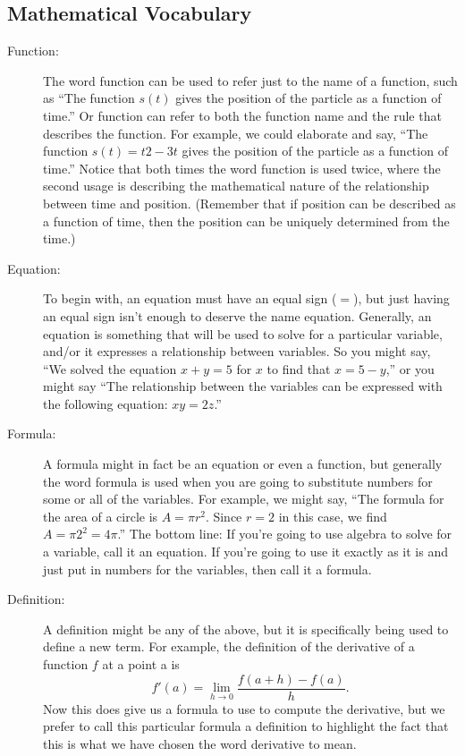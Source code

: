 \subsection{Mathematical Vocabulary}
\begin{description}
    \item[Function:] The word function can be used to refer just to the name of a
        function, such as  ``The function $s(t)$ gives the position of the particle as a
        function of time.'' Or function can refer to both the function name and the rule
        that describes the function. For example, we could elaborate and say, ``The
        function $s(t) = t2 - 3t$ gives the position of the particle as a function of
        time.'' Notice that both times the word function is used twice, where the second
        usage is describing the mathematical nature of the relationship between time and
        position. (Remember that if position can be described as a function of time, then
        the position can be uniquely determined from the time.)
    \item[Equation:] To begin with, an equation must have an equal sign ($=$), but just
        having an equal sign isn't enough to deserve the name equation. Generally, an
        equation is something that will be used to solve for a particular variable, and/or
        it expresses a relationship between variables. So you might say, ``We solved the
        equation $x + y = 5$ for $x$ to find that $x = 5 - y$,'' or you might say ``The
        relationship between the variables can be expressed with the following equation:
        $xy = 2z$.''

    \item[Formula:] A formula might in fact be an equation or even a function, but
        generally the word formula is used when you are going to substitute numbers for
        some or all of the variables.  For example, we might say, ``The formula for the
        area of a circle is $A = \pi r^2$.  Since $r = 2$ in this case, we find $A = \pi
        2^2 = 4\pi$.''  The bottom line: If you're going to use algebra to solve for a
        variable, call it an equation. If you’re going to use it exactly as it is and just
        put in numbers for the variables, then call it a formula.

    \item[Definition:] A definition might be any of the above, but it is specifically
        being used to define a new term. For example, the definition of the derivative of
        a function $f$ at a point a is  
        \[ f'(a) = \lim_{h \to 0} \frac{f(a+h)-f(a)}{h}. \]
        Now this does give us a formula to use to compute the derivative, but we prefer to
        call this particular formula a definition to highlight the fact that this is what
        we have chosen the word derivative to mean.


\end{description}
